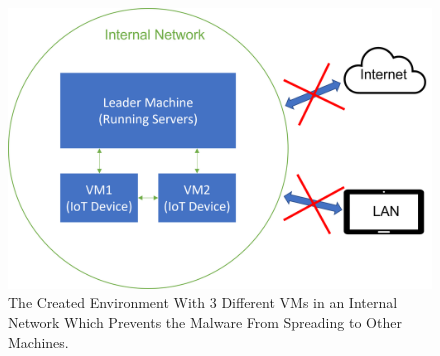 \begin{figure}[h!]
\includegraphics[scale=0.7]{assets/architecture.png}
\centering
\caption{The Created Environment With 3 Different VMs in an Internal Network Which Prevents the Malware From Spreading to Other Machines. }
    \label{graphic:architecture}
\end{figure}




